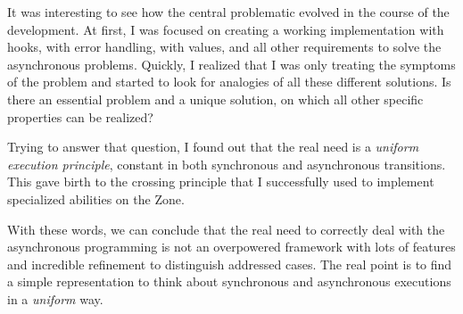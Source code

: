 It was interesting to see how the central problematic evolved in the course of the development. At first, I was focused on creating a working implementation with hooks, with error handling, with values, and all other requirements to solve the asynchronous problems. Quickly, I realized that I was only treating the symptoms of the problem and started to look for analogies of all these different solutions. Is there an essential problem and a unique solution, on which all other specific properties can be realized?

Trying to answer that question, I found out that the real need is a \emph{uniform execution principle}, constant in both synchronous and asynchronous transitions. This gave birth to the crossing principle that I successfully used to implement specialized abilities on the Zone.

With these words, we can conclude that the real need to correctly deal with the asynchronous programming is not an overpowered framework with lots of features and incredible refinement to distinguish addressed cases. The real point is to find a simple representation to think about synchronous and asynchronous executions in a \emph{uniform} way.
